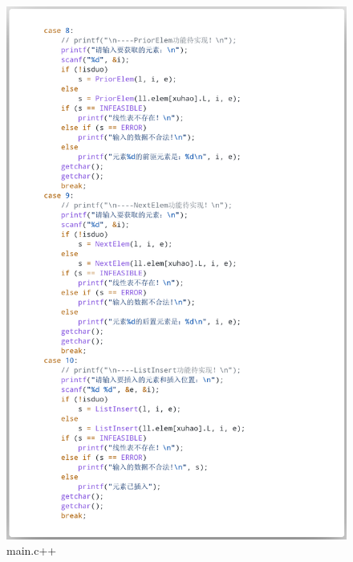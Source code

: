 \documentclass[supercite]{Experimental_Report}
\theoremstyle{definition}
\begin{document}
\begin{figure}[htb]
	\begin{center}
		\includegraphics[scale=0.30]{images/3-12.png}
		\caption{main.c++}
		\label{fig3-12}
	\end{center}
\end{figure}
\end{document}
